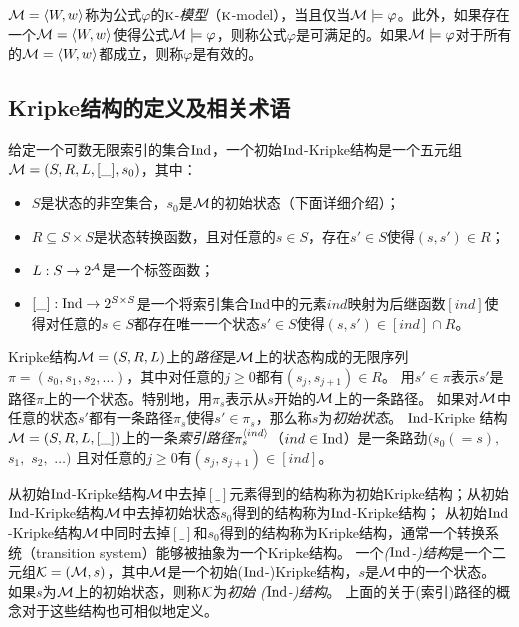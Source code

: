 ${\cal M}={\langle{W,w}\rangle}$称为公式$\varphi$的$\textsc{k}$-\emph{模型}（$\textsc{k}$-model），当且仅当${\cal M} \models \varphi$。此外，如果存在一个${\cal M}={\langle{W,w}\rangle}$使得公式${\cal M}\models \varphi$，则称公式$\varphi$是可满足的。如果${\cal M}\models \varphi$对于所有的${\cal M}={\langle{W,w}\rangle}$都成立，则称$\varphi$是有效的。


\subsection{Kripke结构的定义及相关术语}
给定一个可数无限索引的集合$\textrm{Ind}$，一个初始$\textrm{Ind}$-Kripke结构是一个五元组${\cal M}=(S,R,L,[\_],s_0)$，其中：
\begin{itemize}
	\item $S$是状态的非空集合，$s_0$是${\cal M}$的初始状态（下面详细介绍）；
	\item $R \subseteq S \times S$是状态转换函数，且对任意的$s\in S$，存在$s'\in S$使得$(s,s') \in R$；
	\item $L:S\rightarrow 2^{{\cal A}}$是一个标签函数；
	\item $[\_]: \textrm{Ind} \rightarrow 2^{S \times S}$是一个将索引集合$\textrm{Ind}$中的元素$ind$映射为后继函数$[ind]$使得对任意的$s\in S$都存在唯一一个状态$s'\in S$使得$(s,s')\in [ind] \cap R$。
\end{itemize}

Kripke结构${\cal M}=(S,R,L)$上的{\em 路径}是${\cal M}$上的状态构成的无限序列$\pi=(s_0, s_{1}, s_{2},\dots)$，其中对任意的$j\ge 0$都有$(s_j, s_{j+1}) \in R$。
用$s'\in \pi$表示$s'$是路径$\pi$上的一个状态。特别地，用$\pi_{s}$表示从$s$开始的${\cal M}$上的一条路径。
如果对${\cal M}$中任意的状态$s'$都有一条路径$\pi_s$使得$s'\in \pi_s$，那么称$s$为\emph{初始状态}。
$\textrm{Ind}$-Kripke 结构 ${\cal M}=(S,R,L, [\_])$上的一条\emph{索引路径}$\pi_{s}^{{\langle{ind}\rangle}}$（$ind \in \textrm{Ind}$）是一条路劲$(s_0(=s),$ $s_{1},$ $s_{2},$ $\dots)$ 且对任意的$j \geq 0$有$(s_j, s_{j+1}) \in [ind]$。

从初始$\textrm{Ind}$-Kripke结构${\cal M}$中去掉$[\_]$元素得到的结构称为初始Kripke结构；从初始$\textrm{Ind}$-Kripke结构${\cal M}$中去掉初始状态$s_0$得到的结构称为$\textrm{Ind}$-Kripke结构；
从初始$\textrm{Ind}$-Kripke结构${\cal M}$中同时去掉$[\_]$和$s_0$得到的结构称为Kripke结构，通常一个转换系统（transition system）能够被抽象为一个Kripke结构\cite{Baier:PMC:2008}。
一个\emph{($\textrm{Ind}$-)结构}是一个二元组${\cal K}=({\cal M}, s)$，其中${\cal M}$是一个初始($\textrm{Ind}$-)Kripke结构，$s$是${\cal M}$中的一个状态。
如果$s$为${\cal M}$上的初始状态，则称${\cal K}$为{\em 初始 ($\textrm{Ind}$-)结构}。
上面的关于(索引)路径的概念对于这些结构也可相似地定义。
 





